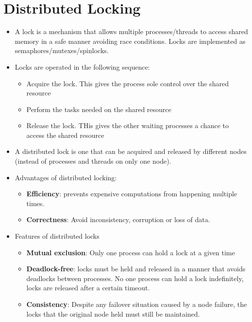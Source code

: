 \documentclass{article}
\begin{document}
\section{Distributed Locking}
\begin{itemize}
    \item A lock is a mechanism that allows multiple processes/threads to access shared memory in a safe manner avoiding race conditions. Locks are implemented as semaphores/mutexes/spinlocks. 
    
    \item Locks are operated in the following sequence:
    \begin{itemize}
        \item Acquire the lock. This gives the process sole control over the shared resource
        
        \item Perform the tasks needed on the shared resource
        
        \item Release the lock. THis gives the other waiting processes a chance to access the shared resource
    \end{itemize}
    
    \item A distributed lock is one that can be acquired and released by different nodes (instead of processes and threads on only one node). 
    
    \item Advantages of distributed locking:
    \begin{itemize}
        \item \textbf{Efficiency}: prevents expensive computations from happening multiple times. 
        
        \item \textbf{Correctness}: Avoid inconsistency, corruption or loss of data. 
    \end{itemize}
    
    \item Features of distributed locks
    \begin{itemize}
        \item \textbf{Mutual exclusion}: Only one process can hold a lock at a given time
        
        \item \textbf{Deadlock-free}: locks must be held and released in a manner that avoids deadlocks between processes. No one process can hold a lock indefinitely, locks are released after a certain timeout.
        
        \item \textbf{Consistency}: Despite any failover situation caused by a node failure, the locks that the original node held must still be maintained. 
    \end{itemize}

\end{itemize}
\end{document}
